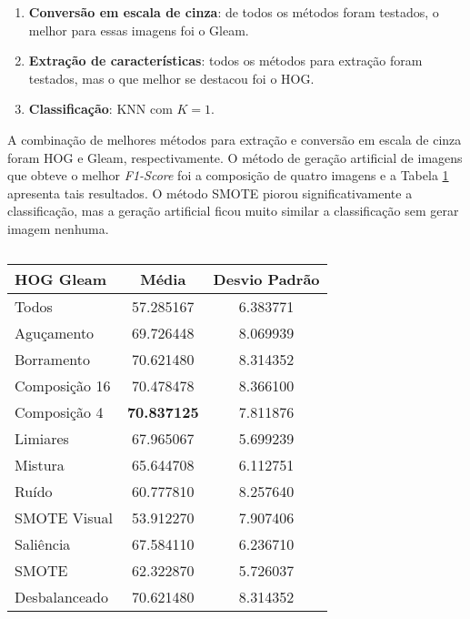 \begin{enumerate}
\item \textbf{Conversão em escala de cinza}: de todos os métodos foram testados, o melhor para essas imagens foi o Gleam.
\item \textbf{Extração de características}: todos os métodos para extração foram testados, mas o que melhor se destacou foi o HOG.
\item \textbf{Classificação}: KNN com $K=1$.
\end{enumerate}


A combinação de melhores métodos para extração e conversão em escala de cinza foram HOG e Gleam, respectivamente. O método de geração artificial de imagens que obteve o melhor \textit{F1-Score} foi a composição de quatro imagens e a Tabela \ref{tab:resultados:4.2} apresenta tais resultados. O método SMOTE piorou significativamente a classificação, mas a geração artificial ficou muito similar a classificação sem gerar imagem nenhuma.

\begin{table}[H]
\begin{center}
\caption{}
\label{tab:resultados:4.2}
\begin{tabular}{|l|c|c|}
\hline
\textbf{HOG Gleam} & \textbf{Média}     & \textbf{Desvio Padrão} \\ \hline
   Todos        &  57.285167 &  6.383771  \\ \hline
  Aguçamento    &  69.726448 &  8.069939  \\ \hline
  Borramento    &  70.621480 &  8.314352  \\ \hline
  Composição 16 &  70.478478 &  8.366100  \\ \hline
  Composição 4  &  \textbf{70.837125} &  7.811876  \\ \hline
  Limiares      &  67.965067 &  5.699239  \\ \hline
  Mistura       &  65.644708 &  6.112751  \\ \hline
  Ruído         &  60.777810 &  8.257640  \\ \hline
  SMOTE Visual  &  53.912270 &  7.907406  \\ \hline
  Saliência     &  67.584110 &  6.236710  \\ \hline
 SMOTE          &  62.322870 &  5.726037  \\ \hline
Desbalanceado   &  70.621480 &  8.314352  \\ \hline
\end{tabular}
\end{center}
\end{table}


